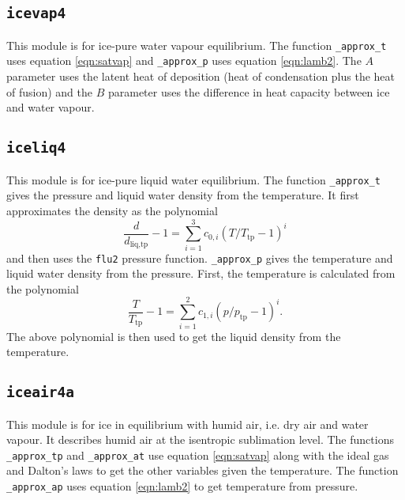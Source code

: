 \documentclass{article}
\newcommand{\liq}{\text{liq}}
\newcommand{\tp}{\text{tp}}
\begin{document}
\subsection{\texttt{icevap4}}

This module is for ice-pure water vapour equilibrium. The function \texttt{\_approx\_t} uses equation \ref{eqn:satvap} and \texttt{\_approx\_p} uses equation \ref{eqn:lamb2}. The $A$ parameter uses the latent heat of deposition (heat of condensation plus the heat of fusion) and the $B$ parameter uses the difference in heat capacity between ice and water vapour.


\subsection{\texttt{iceliq4}}

This module is for ice-pure liquid water equilibrium. The function \texttt{\_approx\_t} gives the pressure and liquid water density from the temperature. It first approximates the density as the polynomial
\begin{equation*}
    \frac{d}{d_{\liq,\tp}} - 1 = \sum_{i=1}^3 c_{0,i} (T/T_{\tp}-1)^i
\end{equation*}
and then uses the \texttt{flu2} pressure function. \texttt{\_approx\_p} gives the temperature and liquid water density from the pressure. First, the temperature is calculated from the polynomial
\begin{equation*}
    \frac{T}{T_{\tp}} - 1 = \sum_{i=1}^2 c_{1,i} (p/p_{\tp}-1)^i.
\end{equation*}
The above polynomial is then used to get the liquid density from the temperature.


\subsection{\texttt{iceair4a}}

This module is for ice in equilibrium with humid air, i.e. dry air and water vapour. It describes humid air at the isentropic sublimation level. The functions \texttt{\_approx\_tp} and \texttt{\_approx\_at} use equation \ref{eqn:satvap} along with the ideal gas and Dalton's laws to get the other variables given the temperature. The function \texttt{\_approx\_ap} uses equation \ref{eqn:lamb2} to get temperature from pressure.
\end{document}
